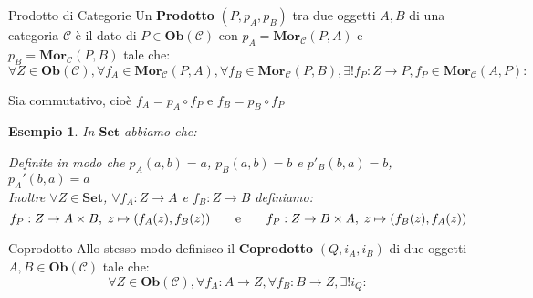 \documentclass[11pt,a4paper,twoside]{article}
\newtheorem{es}{Esempio}
\theoremstyle{definition}
\begin{document}
\begin{defn}{Prodotto di Categorie}{}
	Un \textbf{Prodotto} $(P, p_A, p_B)$ tra due oggetti $A, B$ di una categoria $\mathcal C$ è il dato di $P \in \bm{Ob}(\mathcal C)$ con $p_A = \bm{Mor}_{\mathcal C}(P, A)$ e $p_B = \bm{Mor}_\mathcal C(P, B)$ tale che:
	\[\forall Z \in \bm{Ob}(\mathcal C), \forall f_A \in \bm{Mor}_\mathcal C(P, A), \forall f_B \in \bm{Mor}_\mathcal C(P,B), \exists ! f_P \colon Z \to P, f_P \in \bm{Mor}_\mathcal C(A, P):\]
	\begin{center}
	\end{center}
	Sia commutativo, cioè $f_A = p_A \circ f_P$ e $f_B = p_B \circ f_P$
\end{defn}

\begin{es}
	In $\bm{Set}$ abbiamo che:
	\begin{center}
	\end{center}
	Definite in modo che $p_A(a,b) = a$, $p_B(a,b) = b$ e $p'_B(b,a) = b$, $p_A'(b,a) = a$\\
	Inoltre $\forall Z \in \bm{Set}$, $\forall f_A:Z \to A$ e $f_B:Z \to B$ definiamo:
	\[ f_P : Z\to A \times B,\; z \mapsto (f_A(z), f_B(z)) \qquad \text e \qquad f_P: Z \to B\times A, \; z \mapsto (f_B(z), f_A(z)) \]
\end{es}

\begin{defn}{Coprodotto}{}
	Allo stesso modo definisco il \textbf{Coprodotto} $(Q, i_A, i_B)$ di due oggetti $A, B \in\bm{Ob}(\mathcal C)$ tale che:
	\[\forall Z \in \bm{Ob}(\mathcal C), \forall f_A: A \to Z, \forall f_B : B \to Z, \exists ! i_Q:\]
	\begin{center}
	\end{center}
\end{defn}
\end{document}

